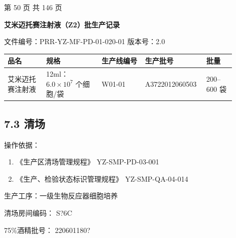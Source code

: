 \documentclass[UTF8,10pt,a4paper,fontset=fandol]{ctexart}
\newcommand{\fieldvalue}[1]{#1}
\newcommand{\handwritten}[1]{#1}
\begin{document}
\vfill

\begin{center}
第 50 页 共 146 页
\end{center}

\newpage

\begin{center}
\textbf{艾米迈托赛注射液（Z2）批生产记录}
\end{center}

\noindent
文件编号：PRR-YZ-MF-PD-01-020-01 \quad 版本号：2.0

\begin{center}
\begin{tabular}{|p{0.16\linewidth}|p{0.23\linewidth}|p{0.18\linewidth}|p{0.20\linewidth}|p{0.12\linewidth}|}
\hline
品名 & 规格 & 生产线编号 & 生产批号 & 批量 \\
\hline
艾米迈托赛注射液 &
12ml：$6.0\times10^{7}$ 个细胞/袋 &
\fieldvalue{\handwritten{W01-01}} &
\fieldvalue{\handwritten{A3722012060503}} &
200--600 袋 \\
\hline
\end{tabular}
\end{center}

\subsection*{7.3 清场}

\noindent
操作依据：

\begin{enumerate}
  \item 《生产区清场管理规程》 \hfill YZ-SMP-PD-03-001
  \item 《生产、检验状态标识管理规程》 \hfill YZ-SMP-QA-04-014
\end{enumerate}

\noindent
生产工序：一级生物反应器细胞培养

\noindent
清场房间编码：
\fieldvalue{\handwritten{S?6C}}

\hspace{1em}75\%酒精批号：
\fieldvalue{\handwritten{220601180?}}
\end{document}
